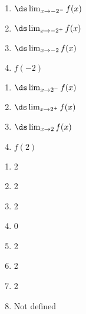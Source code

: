 {
\noindent\begin{minipage}{\linewidth}\centering
{}
\end{minipage}

\noindent\begin{minipage}[t]{.5\linewidth}
\begin{enumerate}
\item		$\ds \lim_{x\to -2^-} f(x)$
\item		$\ds \lim_{x\to -2^+} f(x)$
\item		$\ds \lim_{x\to -2} f(x)$
\item		$f(-2)$
\end{enumerate}
\end{minipage}
\noindent\begin{minipage}[t]{.5\linewidth}
\begin{enumerate}\addtocounter{enumii}{4}
\item		$\ds \lim_{x\to 2^-} f(x)$
\item		$\ds \lim_{x\to 2^+} f(x)$
\item		$\ds \lim_{x\to 2} f(x)$
\item		$f(2)$
\end{enumerate}
\end{minipage}
}
{\begin{enumerate}
\item		2
\item		2
\item		2
\item		0
\item		2
\item		2
\item		2
\item		Not defined

\end{enumerate}
}


